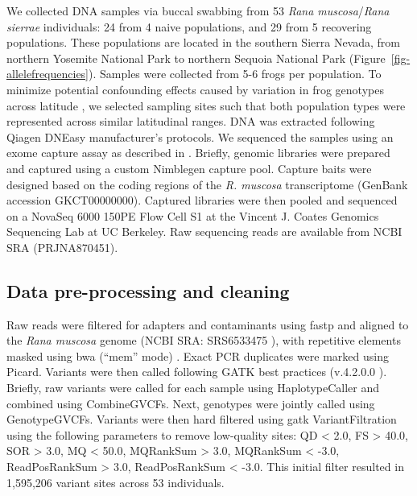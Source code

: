 \documentclass[9pt,twocolumn,twoside,lineno]{pnas-new}
\begin{document}
{We collected DNA samples via buccal swabbing \citep{broquet2007} from 53
\emph{Rana muscosa}/\emph{Rana sierrae} individuals: 24 from 4 naive
populations, and 29 from 5 recovering populations. These populations are
located in the southern Sierra Nevada, from northern Yosemite National
Park to northern Sequoia National Park
(Figure~\ref{fig-allelefrequencies}). Samples were collected from 5-6
frogs per population. To minimize potential confounding effects caused
by variation in frog genotypes across latitude \citep{byrne2023}, we
selected sampling sites such that both population types were represented
across similar latitudinal ranges. DNA was extracted following Qiagen
DNEasy manufacturer's protocols. We sequenced the samples using an exome
capture assay as described in \citep{byrne2023}. Briefly, genomic
libraries were prepared and captured using a custom Nimblegen capture
pool. Capture baits were designed based on the coding regions of the
\emph{R. muscosa} transcriptome (GenBank accession GKCT00000000).
Captured libraries were then pooled and sequenced on a NovaSeq 6000
150PE Flow Cell S1 at the Vincent J. Coates Genomics Sequencing Lab at
UC Berkeley. Raw sequencing reads are available from NCBI SRA
(PRJNA870451).

\hypertarget{data-pre-processing-and-cleaning}{%
\subsection*{Data pre-processing and
cleaning}\label{data-pre-processing-and-cleaning}}

Raw reads were filtered for adapters and contaminants using fastp
\citep{chen2018} and aligned to the \emph{Rana muscosa} genome (NCBI
SRA: SRS6533475 \citep{hon2020}), with repetitive elements masked using
bwa (``mem'' mode) \citep{li2013}. Exact PCR duplicates were marked
using Picard. Variants were then called following GATK best practices
(v.4.2.0.0 \citep{van2020}). Briefly, raw variants were called for each
sample using HaplotypeCaller and combined using CombineGVCFs. Next,
genotypes were jointly called using GenotypeGVCFs. Variants were then
hard filtered using gatk VariantFiltration using the following
parameters to remove low-quality sites: QD \textless{} 2.0, FS
\textgreater{} 40.0, SOR \textgreater{} 3.0, MQ \textless{} 50.0,
MQRankSum \textgreater{} 3.0, MQRankSum \textless{} -3.0, ReadPosRankSum
\textgreater{} 3.0, ReadPosRankSum \textless{} -3.0. This initial filter
resulted in 1,595,206 variant sites across 53 individuals.

}
\end{document}

